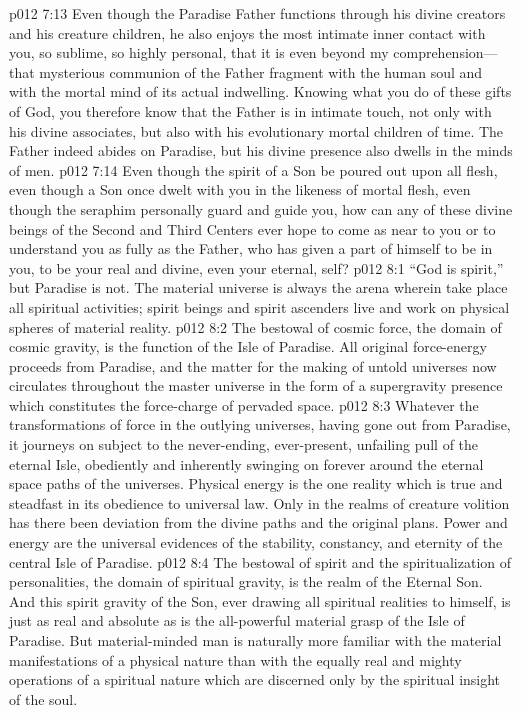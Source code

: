 \pc \vs p012 7:13 Even though the Paradise Father functions through his divine creators and his creature children, he also enjoys the most intimate inner contact with you, so sublime, so highly personal, that it is even beyond my comprehension---that mysterious communion of the Father fragment with the human soul and with the mortal mind of its actual indwelling. Knowing what you do of these gifts of God, you therefore know that the Father is in intimate touch, not only with his divine associates, but also with his evolutionary mortal children of time. The Father indeed abides on Paradise, but his divine presence also dwells in the minds of men.
\vs p012 7:14 Even though the spirit of a Son be poured out upon all flesh, even though a Son once dwelt with you in the likeness of mortal flesh, even though the seraphim personally guard and guide you, how can any of these divine beings of the Second and Third Centers ever hope to come as near to you or to understand you as fully as the Father, who has given a part of himself to be in you, to be your real and divine, even your eternal, self?
\vs p012 8:1 “God is spirit,” but Paradise is not. The material universe is always the arena wherein take place all spiritual activities; spirit beings and spirit ascenders live and work on physical spheres of material reality.
\pc \vs p012 8:2 The bestowal of cosmic force, the domain of cosmic gravity, is the function of the Isle of Paradise. All original force\hyp{}energy proceeds from Paradise, and the matter for the making of untold universes now circulates throughout the master universe in the form of a supergravity presence which constitutes the force\hyp{}charge of pervaded space.
\vs p012 8:3 Whatever the transformations of force in the outlying universes, having gone out from Paradise, it journeys on subject to the never\hyp{}ending, ever\hyp{}present, unfailing pull of the eternal Isle, obediently and inherently swinging on forever around the eternal space paths of the universes. Physical energy is the one reality which is true and steadfast in its obedience to universal law. Only in the realms of creature volition has there been deviation from the divine paths and the original plans. Power and energy are the universal evidences of the stability, constancy, and eternity of the central Isle of Paradise.
\pc \vs p012 8:4 The bestowal of spirit and the spiritualization of personalities, the domain of spiritual gravity, is the realm of the Eternal Son. And this spirit gravity of the Son, ever drawing all spiritual realities to himself, is just as real and absolute as is the all\hyp{}powerful material grasp of the Isle of Paradise. But material\hyp{}minded man is naturally more familiar with the material manifestations of a physical nature than with the equally real and mighty operations of a spiritual nature which are discerned only by the spiritual insight of the soul.
